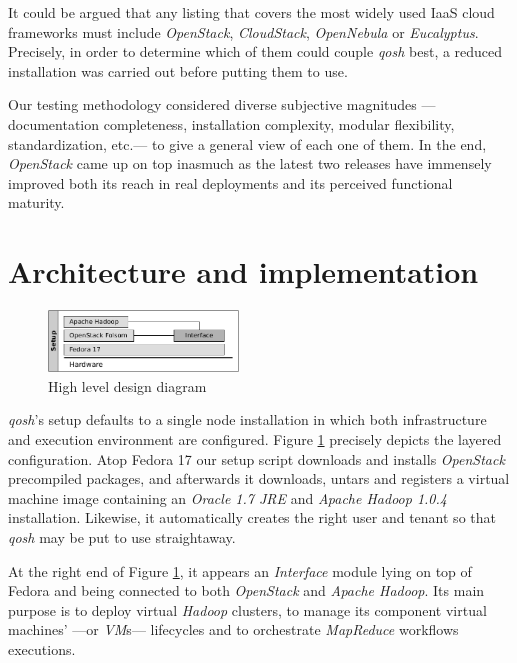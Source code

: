 \documentclass{sig-alternate}
\begin{document}
It could be argued that any listing that covers the most widely used IaaS cloud frameworks must include \emph{OpenStack}, \emph{CloudStack}, \emph{OpenNebula} or \emph{Eucalyptus}. Precisely, in order to determine which of them could couple \emph{qosh} best, a reduced installation was carried out before putting them to use.

Our testing methodology considered diverse subjective magnitudes ---documentation completeness, installation complexity, modular flexibility, standardization, etc.--- to give a general view of each one of them. In the end, \emph{OpenStack} came up on top inasmuch as the latest two releases have immensely improved both its reach in real deployments and its perceived functional maturity.



\section{Architecture and implementation}\label{sec:arch}

\begin{figure}[tp]
\centering
\includegraphics[width=0.45\textwidth]{img/002}
\caption{High level design diagram}
\label{fig:arch1}
\end{figure}

\noindent \emph{qosh}'s setup defaults to a single node installation in which both infrastructure and execution environment are configured. Figure \ref{fig:arch1} precisely depicts the layered configuration. Atop Fedora 17 our setup script downloads and installs \emph{OpenStack} precompiled packages, and afterwards it downloads, untars and registers a virtual machine image containing an \emph{Oracle 1.7 JRE} and \emph{Apache Hadoop 1.0.4} installation. Likewise, it automatically creates the right user and tenant so that \emph{qosh} may be put to use straightaway.





At the right end of Figure \ref{fig:arch1}, it appears an \emph{Interface} module lying on top of Fedora and being connected to both \emph{OpenStack} and \emph{Apache Hadoop}. Its main purpose is to deploy virtual \emph{Hadoop} clusters, to manage its component virtual machines' ---or \emph{VM}s--- lifecycles and to orchestrate \emph{MapReduce} workflows executions.
\end{document}
